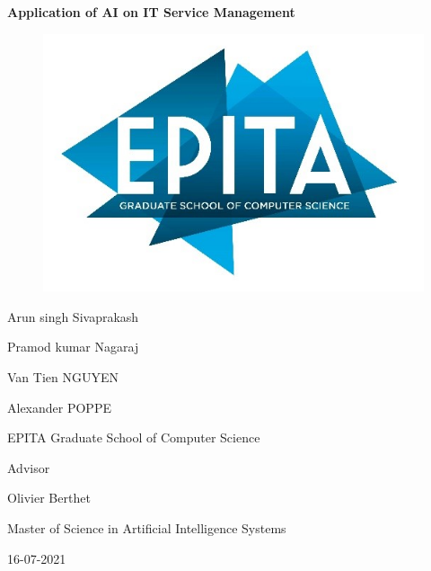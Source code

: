 \documentclass[a4paper,12pt]{report}
\author{}
\date{}
\begin{document}
    \begin{titlepage}
        \begin{center}
            
            \textbf{\Large Application of AI on IT Service Management}
                
            \vspace{1.5cm}

            \begin{figure}[h]
                \includegraphics[scale=1.0]{EPITA.jpg}
                \centering
            \end{figure}
    
            \begin{center}
                \centerline{Arun singh Sivaprakash}
                \centerline{Pramod kumar Nagaraj}
                \centerline{Van Tien NGUYEN}
                \centerline{Alexander POPPE}
            \end{center}
    
            \vfill

            \centerline{EPITA Graduate School of Computer Science}
            
                
            \begin{center}
                \centerline{Advisor}
                \centerline{ Olivier Berthet}
            \end{center}
        
            \begin{center}
                Master of Science in Artificial Intelligence Systems
            \end{center}
        
            \vfill
            \centerline{16-07-2021}
                
        \end{center}
    \end{titlepage}
\end{document}
